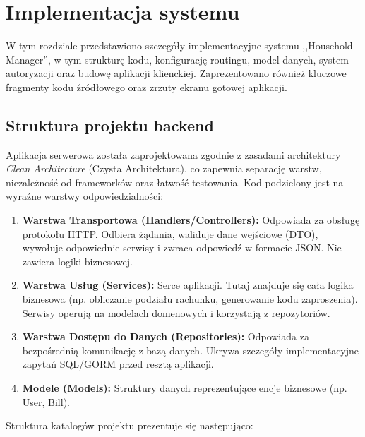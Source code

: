 \chapter{Implementacja systemu}
\label{rozdzial4}

W tym rozdziale przedstawiono szczegóły implementacyjne systemu ,,Household Manager'', w tym strukturę kodu, konfigurację routingu, model danych, system autoryzacji oraz budowę aplikacji klienckiej. Zaprezentowano również kluczowe fragmenty kodu źródłowego oraz zrzuty ekranu gotowej aplikacji.

\section{Struktura projektu backend}

Aplikacja serwerowa została zaprojektowana zgodnie z zasadami architektury \textit{Clean Architecture} (Czysta Architektura), co zapewnia separację warstw, niezależność od frameworków oraz łatwość testowania. Kod podzielony jest na wyraźne warstwy odpowiedzialności:

\begin{enumerate}
    \item \textbf{Warstwa Transportowa (Handlers/Controllers):} Odpowiada za obsługę protokołu HTTP. Odbiera żądania, waliduje dane wejściowe (DTO), wywołuje odpowiednie serwisy i zwraca odpowiedź w formacie JSON. Nie zawiera logiki biznesowej.
    \item \textbf{Warstwa Usług (Services):} Serce aplikacji. Tutaj znajduje się cała logika biznesowa (np. obliczanie podziału rachunku, generowanie kodu zaproszenia). Serwisy operują na modelach domenowych i korzystają z repozytoriów.
    \item \textbf{Warstwa Dostępu do Danych (Repositories):} Odpowiada za bezpośrednią komunikację z bazą danych. Ukrywa szczegóły implementacyjne zapytań SQL/GORM przed resztą aplikacji.
    \item \textbf{Modele (Models):} Struktury danych reprezentujące encje biznesowe (np. User, Bill).
\end{enumerate}

Struktura katalogów projektu prezentuje się następująco:

